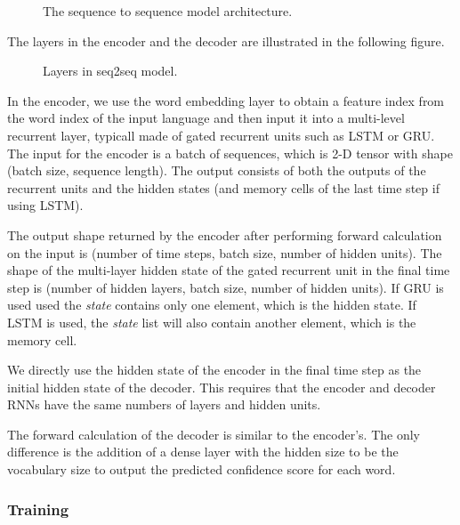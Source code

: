 \begin{figure}[hpt]
	\centering
	
	\caption{The sequence to sequence model architecture.}
	\label{fig:seq2seq}
\end{figure}

The layers in the encoder and the decoder are illustrated in the following figure.

\begin{figure}[hpt]
	\centering
	
	\caption{Layers in seq2seq model.}
	\label{fig:seq2seq_details}
\end{figure}


In the encoder, we use the word embedding layer to obtain a feature index from the word index of the input language and then input it into a multi-level recurrent layer, typicall made of gated recurrent units such as LSTM or GRU. The input for the encoder is a batch of sequences, which is 2-D tensor with shape (batch size, sequence length). The output consists of both the outputs of the recurrent units and the hidden states (and memory cells of the last time step if using LSTM).

The output shape returned by the encoder after performing forward calculation on the input is (number of time steps, batch size, number of hidden units). The shape of the multi-layer hidden state of the gated recurrent unit in the final time step is (number of hidden layers, batch size, number of hidden units). If GRU is used used the \textit{state}  contains only one element, which is the hidden state. If LSTM is used, the \textit{state} list will also contain another element, which is the memory cell.


We directly use the hidden state of the encoder in the final time step as the initial hidden state of the decoder. This requires that the encoder and decoder RNNs have the same numbers of layers and hidden units.

The forward calculation of the decoder is similar to the encoder's. The only difference is the addition of a dense layer with the hidden size to be the vocabulary size to output the predicted confidence score for each word.

\subsubsection{Training}

